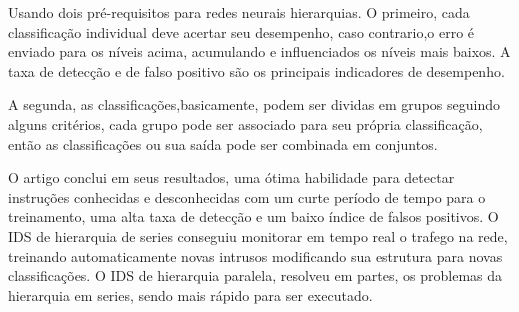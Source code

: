 Usando dois pré-requisitos para redes neurais hierarquias. O primeiro, cada classificação individual deve acertar seu desempenho, caso contrario,o erro é enviado para os níveis acima, acumulando e influenciados os níveis mais baixos. A taxa de detecção e de falso positivo são os principais indicadores de desempenho. 

A segunda, as classificações,basicamente, podem ser dividas em grupos seguindo alguns critérios, cada grupo pode ser associado para seu própria classificação, então as classificações ou sua saída pode ser combinada em conjuntos.

O artigo conclui em seus resultados, uma ótima habilidade para detectar instruções conhecidas e desconhecidas com um curte período de tempo para o treinamento, uma alta taxa de detecção e um baixo índice de falsos positivos.
O IDS de hierarquia de series conseguiu monitorar em tempo real o trafego na rede, treinando automaticamente novas intrusos modificando sua estrutura para novas classificações. O IDS de hierarquia paralela, resolveu em partes, os problemas da hierarquia em series, sendo mais rápido para ser executado.

